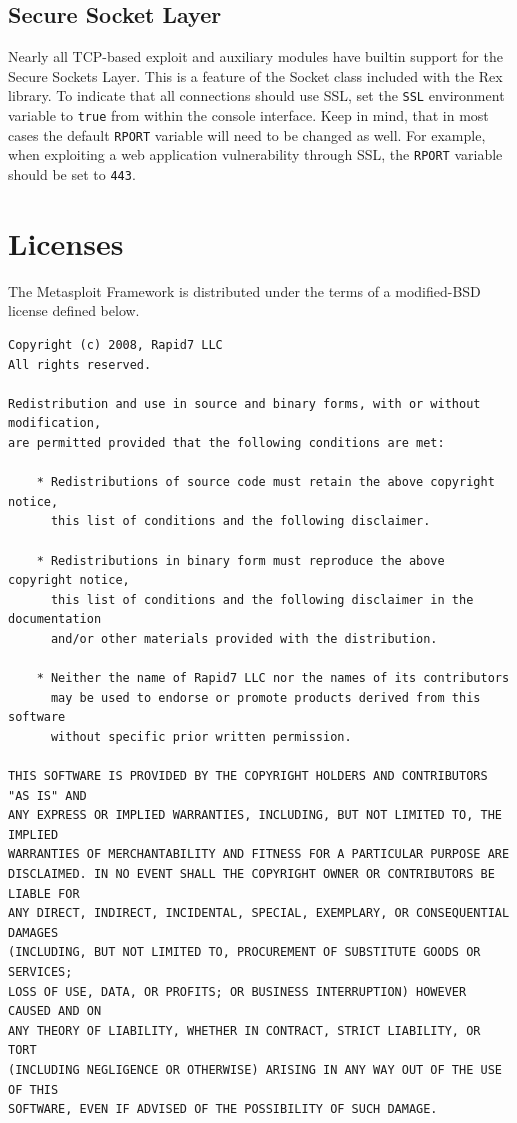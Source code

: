 \documentclass{report}
\begin{document}
	\section{Secure Socket Layer}
	\label{REF-SSL}

\par
Nearly all TCP-based exploit and auxiliary modules have builtin support for the
Secure Sockets Layer. This is a feature of the Socket class included with the
Rex library. To indicate that all connections should use SSL, set the
\texttt{SSL} environment variable to \texttt{true} from within the console
interface. Keep in mind, that in most cases the default \texttt{RPORT} variable
will need to be changed as well. For example, when exploiting a web application
vulnerability through SSL, the \texttt{RPORT} variable should be set to
\texttt{443}.

\pagebreak

\chapter{Licenses}

\par
The Metasploit Framework is distributed under the terms of a modified-BSD
license defined below.

{\footnotesize
\begin{verbatim}
Copyright (c) 2008, Rapid7 LLC
All rights reserved.

Redistribution and use in source and binary forms, with or without modification,
are permitted provided that the following conditions are met:

    * Redistributions of source code must retain the above copyright notice,
	  this list of conditions and the following disclaimer.

    * Redistributions in binary form must reproduce the above copyright notice,
	  this list of conditions and the following disclaimer in the documentation
	  and/or other materials provided with the distribution.

    * Neither the name of Rapid7 LLC nor the names of its contributors
	  may be used to endorse or promote products derived from this software
	  without specific prior written permission.

THIS SOFTWARE IS PROVIDED BY THE COPYRIGHT HOLDERS AND CONTRIBUTORS "AS IS" AND
ANY EXPRESS OR IMPLIED WARRANTIES, INCLUDING, BUT NOT LIMITED TO, THE IMPLIED
WARRANTIES OF MERCHANTABILITY AND FITNESS FOR A PARTICULAR PURPOSE ARE
DISCLAIMED. IN NO EVENT SHALL THE COPYRIGHT OWNER OR CONTRIBUTORS BE LIABLE FOR
ANY DIRECT, INDIRECT, INCIDENTAL, SPECIAL, EXEMPLARY, OR CONSEQUENTIAL DAMAGES
(INCLUDING, BUT NOT LIMITED TO, PROCUREMENT OF SUBSTITUTE GOODS OR SERVICES;
LOSS OF USE, DATA, OR PROFITS; OR BUSINESS INTERRUPTION) HOWEVER CAUSED AND ON
ANY THEORY OF LIABILITY, WHETHER IN CONTRACT, STRICT LIABILITY, OR TORT
(INCLUDING NEGLIGENCE OR OTHERWISE) ARISING IN ANY WAY OUT OF THE USE OF THIS
SOFTWARE, EVEN IF ADVISED OF THE POSSIBILITY OF SUCH DAMAGE.
\end{verbatim}}
\end{document}
